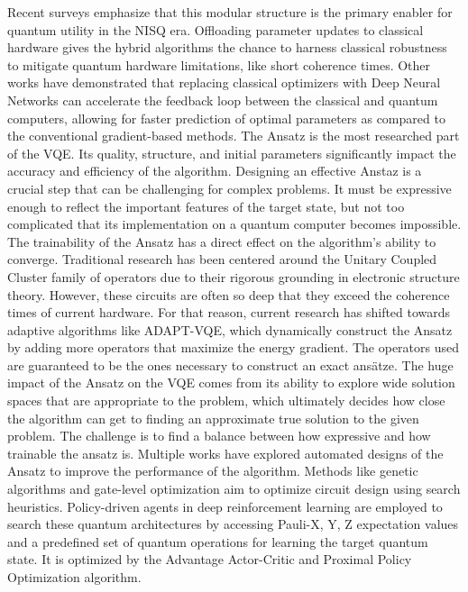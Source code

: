 \documentclass[a4paper]{report}
\begin{document}
{\begin{itemize}
Recent surveys emphasize that this modular structure is the primary enabler for quantum utility in the NISQ era. Offloading parameter updates to classical hardware gives the hybrid algorithms the chance to harness classical robustness to mitigate quantum hardware limitations, like short coherence times\cite{hybrid}.
Other works have demonstrated that replacing classical optimizers with Deep Neural Networks can accelerate the feedback loop between the classical and quantum computers, allowing for faster prediction of optimal parameters as compared to the conventional gradient-based methods\cite{DRL}.
\newline
The Ansatz is the most researched part of the VQE. Its quality, structure, and initial parameters significantly impact the accuracy and efficiency of the algorithm. Designing an effective Anstaz is a crucial step that can be challenging for complex problems. It must be expressive enough to reflect the important features of the target state, but not too complicated that its implementation on a quantum computer becomes impossible\cite{ansatz}. The trainability of the Ansatz has a direct effect on the algorithm's ability to converge.
\newline
Traditional research has been centered around the Unitary Coupled Cluster family of operators due to their rigorous grounding in electronic structure theory\cite{ucc}. However, these circuits are often so deep that they exceed the coherence times of current hardware. For that reason, current research has shifted towards adaptive algorithms like ADAPT-VQE, which dynamically construct the Ansatz by adding more operators that maximize the energy gradient. The operators used are guaranteed to be the ones necessary to construct an exact ansätze\cite{adaptvqe}.
\newline
The huge impact of the Ansatz on the VQE comes from its ability to explore wide solution spaces that are appropriate to the problem, which ultimately decides how close the algorithm can get to finding an approximate true solution to the given problem.
The challenge is to find a balance between how expressive and how trainable the ansatz is. Multiple works have explored automated designs of the Ansatz to improve the performance of the algorithm. Methods like genetic algorithms and gate-level optimization aim to optimize circuit design using search heuristics\cite{automatedansatzdesign}. Policy-driven agents in deep reinforcement learning are employed to search these quantum architectures by accessing Pauli-X, Y, Z expectation values and a predefined set of quantum operations for learning the target quantum state. It is optimized by the Advantage Actor-Critic and Proximal Policy Optimization algorithm\cite{reinlearnagents}. 

\end{itemize}}
\end{document}
